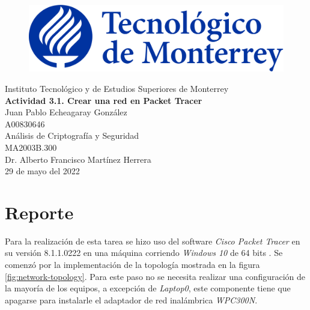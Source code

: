 \documentclass{article}
\begin{document}
    \begin{titlepage}
        \begin{center}
            \begin{figure}
                \centering
                \includegraphics[scale=0.13]{../../../logo_itesm.png}\\ %
            \end{figure}
        \vspace{5cm}
        \LARGE{Instituto Tecnológico y de Estudios Superiores de Monterrey}\\
        \fontsize{12}{14}\selectfont
        \vspace{1cm}
        \textbf{Actividad 3.1. Crear una red en Packet Tracer}\\ %
        \vspace{0.7cm}
        Juan Pablo Echeagaray González\\ %
        \vspace{0.2cm}
        A00830646\\ %
        \vspace{0.7cm}
        Análisis de Criptografía y Seguridad\\ %
        \vspace{0.2cm}
        MA2003B.300\\ %
        \vspace{0.2cm}
        Dr. Alberto Francisco Martínez Herrera\\ %
        \vspace{0.7cm}
        29 de mayo del 2022\\ %
        \end{center}
    \end{titlepage}

    \section{Reporte}

        Para la realización de esta tarea se hizo uso del software \emph{Cisco Packet Tracer} en su versión 8.1.1.0222 en una máquina corriendo \emph{Windows 10} de 64 bits \cite{packet-tracer}. Se comenzó por la implementación de la topología mostrada en la figura \ref{fig:network-topology}. Para este paso no se necesita realizar una configuración de la mayoría de los equipos, a excepción de \emph{Laptop0}, este componente tiene que apagarse para instalarle el adaptador de red inalámbrica \emph{WPC300N}.
\end{document}
